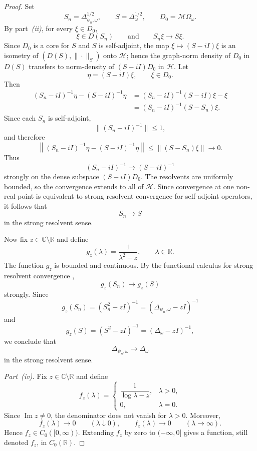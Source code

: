 \documentclass[11pt]{article}
\begin{document}
\begin{proof}
Set
\[
S_n=\Delta_{\psi_n,\omega}^{1/2},
\qquad
S=\Delta_\omega^{1/2},
\qquad
D_0=\mathcal M\Omega_\omega.
\]
By part~\emph{(ii)}, for every $\xi\in D_0$,
\[
\xi\in D(S_n)
\qquad\text{and}\qquad
S_n\xi\longrightarrow S\xi.
\]
Since $D_0$ is a core for $S$ and $S$ is self-adjoint, the map
$\xi\mapsto(S-iI)\xi$ is an isometry of $(D(S),\|\cdot\|_S)$ onto
$\mathcal H$; hence the graph-norm density of $D_0$ in $D(S)$ transfers
to norm-density of $(S-iI)D_0$ in $\mathcal H$. Let
\[
\eta=(S-iI)\xi,
\qquad
\xi\in D_0.
\]
Then
\[
\begin{aligned}
(S_n-iI)^{-1}\eta-(S-iI)^{-1}\eta
&=
(S_n-iI)^{-1}(S-iI)\xi-\xi
\\
&=
(S_n-iI)^{-1}(S-S_n)\xi.
\end{aligned}
\]
Since each $S_n$ is self-adjoint,
\[
\|(S_n-iI)^{-1}\|\leq1,
\]
and therefore
\[
\left\|
(S_n-iI)^{-1}\eta-(S-iI)^{-1}\eta
\right\|
\leq
\|(S-S_n)\xi\|
\longrightarrow0.
\]
Thus
\[
(S_n-iI)^{-1}
\longrightarrow
(S-iI)^{-1}
\]
strongly on the dense subspace $(S-iI)D_0$. The resolvents are uniformly
bounded, so the convergence extends to all of $\mathcal H$. Since
convergence at one non-real point is equivalent to strong resolvent
convergence for self-adjoint operators, it follows that
\[
S_n\longrightarrow S
\]
in the strong resolvent sense.

Now fix $z\in\mathbb C\setminus\mathbb R$ and define
\[
g_z(\lambda)
=
\frac{1}{\lambda^2-z},
\qquad
\lambda\in\mathbb R.
\]
The function $g_z$ is bounded and continuous. By the functional calculus
for strong resolvent convergence
\cite[Thm.~VIII.20]{ReedSimon1980},
\[
g_z(S_n)\longrightarrow g_z(S)
\]
strongly. Since
\[
g_z(S_n)
=
(S_n^2-zI)^{-1}
=
(\Delta_{\psi_n,\omega}-zI)^{-1}
\]
and
\[
g_z(S)
=
(S^2-zI)^{-1}
=
(\Delta_\omega-zI)^{-1},
\]
we conclude that
\[
\Delta_{\psi_n,\omega}
\longrightarrow
\Delta_\omega
\]
in the strong resolvent sense.

\medskip
\noindent
\emph{Part~(iv).}
Fix $z\in\mathbb C\setminus\mathbb R$ and define
\[
f_z(\lambda)
=
\begin{cases}
\dfrac{1}{\log\lambda-z}, & \lambda>0,\\[1ex]
0, & \lambda=0.
\end{cases}
\]
Since $\operatorname{Im}z\neq0$, the denominator does not vanish for
$\lambda>0$. Moreover,
\[
f_z(\lambda)\longrightarrow0
\qquad(\lambda\downarrow0),
\qquad
f_z(\lambda)\longrightarrow0
\qquad(\lambda\to\infty).
\]
Hence $f_z\in C_0([0,\infty))$. Extending $f_z$ by zero to
$(-\infty,0]$ gives a function, still denoted $f_z$, in
$C_0(\mathbb R)$.


\end{proof}
\end{document}
